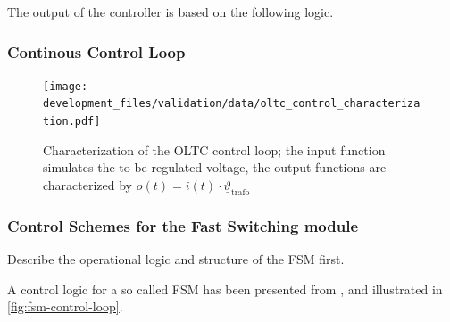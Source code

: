 The output of the controller is based on the following logic.


% 

\subsubsection{Continous Control Loop}

\begin{figure}[htb!]
        \centering
        \texttt{[image: development\_files/validation/data/oltc\_control\_characterization.pdf]}
        \caption[Characterization of the OLTC control loops]{Characterization of the OLTC control loop; the input function simulates the to be regulated voltage, the output functions are characterized by $o(t)=i(t) \cdot \underline{\vartheta}_\mathrm{trafo}$}
        \label{fig:oltc-control-characterization}
\end{figure}

\subsubsection{Control Schemes for the Fast Switching module}



Describe the operational logic and structure of the \acf{FSM} first.

A control logic for a so called \acs{FSM} has been presented from \textcite{burlakin_2024}, and illustrated in \autoref{fig:fsm-control-loop}.

